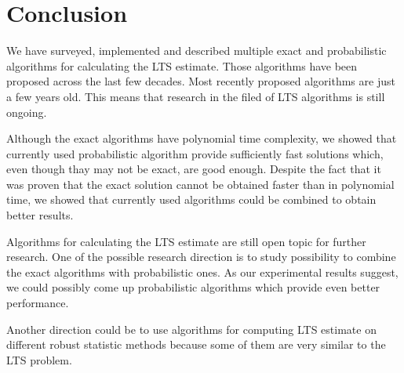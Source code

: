 
\chapter{Conclusion}
We have surveyed, implemented and described multiple exact and probabilistic algorithms for calculating the LTS estimate.
Those algorithms have been proposed across the last few decades. Most recently proposed algorithms are just a few years old. This means that research in the filed of LTS algorithms is still ongoing.

Although the exact algorithms have polynomial time complexity, we showed that currently used probabilistic algorithm provide sufficiently fast solutions which, even though thay may not be exact, are good enough. Despite the fact that it was proven that the exact solution cannot be obtained faster than in polynomial time, we showed that currently used algorithms could be combined to obtain better results. 


Algorithms for calculating the LTS estimate are still open topic for further research. One of the possible research direction is to study possibility to combine the exact algorithms with probabilistic ones. As our experimental results suggest, we could possibly come up probabilistic algorithms which provide even better performance.

Another direction could be to use algorithms for computing LTS estimate on different robust statistic methods because some of them are very similar to the LTS problem.
